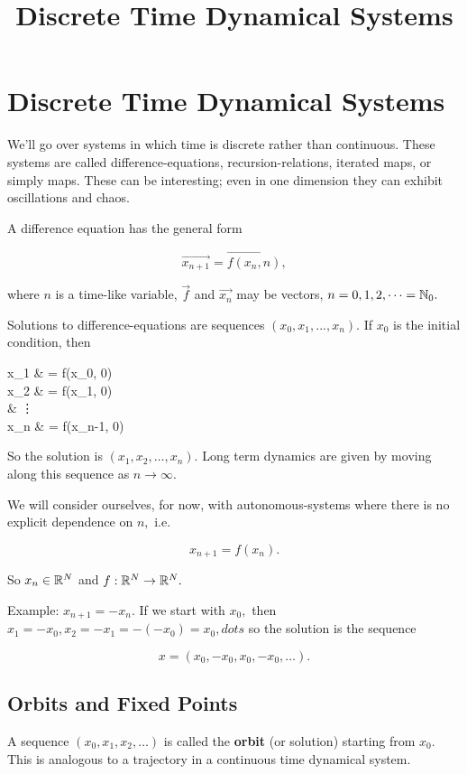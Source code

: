 \documentclass{article}
\title{Discrete Time Dynamical Systems}
\begin{document}
\section{Discrete Time Dynamical Systems}

We'll go over systems in which time is discrete rather than continuous. These systems are called \@{difference-equations}, \@{recursion-relations}, iterated maps, or simply maps. These can be interesting; even in one dimension they can exhibit oscillations and chaos.

\begin{definition}
A difference equation has the general form

\[ \vec{x_{n+1}} = \vec{f(x_n, n)}, \]

where $n$ is a time-like variable, $\vec{f}$ and $\vec{x_n}$ may be \@{vectors}, $n = 0, 1, 2, \dots = \mathbb{N}_0.$
\end{definition}

\@{Solutions} to \@{difference-equations} are \@{sequences} $(x_0, x_1, ..., x_n).$ If $x_0$ is the initial condition, then

\bal
x_1 & = f(x_0, 0) \\
x_2 & = f(x_1, 0) \\
& \vdots \\
x_n & = f(x_{n-1}, 0) \\
\eal

So the \@{solution} is $(x_1, x_2, \dots, x_n).$ Long term dynamics are given by moving along this \@{sequence} as $n \to \infty.$

We will consider ourselves, for now, with \@{autonomous-systems} where there is no explicit dependence on $n,$ i.e.

\[ x_{n+1} = f(x_n). \]

So $x_n \in \mathbb{R}^N$ and $f : \mathbb{R}^N \to \mathbb{R}^N. $

Example: $x_{n+1} =  - x_n.$ If we start with $x_0,$ then $x_1 = -x_0, x_2 = -x_1 = -(-x_0) = x_0, dots$ so the \@{solution} is the \@{sequence}

\[ x = (x_0, -x_0, x_0, -x_0, \dots). \]

\subsection{Orbits and Fixed Points}

\begin{definition}[orbit]
A \@{sequence} $(x_0, x_1, x_2, \dots)$ is called the \textbf{orbit} (or solution) starting from $x_0.$ This is analogous to a \@{trajectory} in a continuous time dynamical system.
\end{definition}
\end{document}
